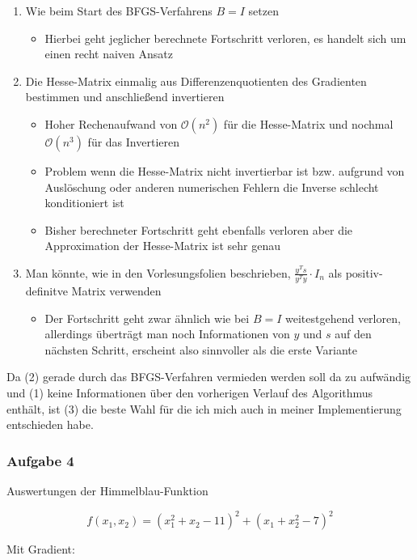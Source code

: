 \documentclass[a4paper, 12pt]{report}
\begin{document}
\begin{enumerate}
  \item Wie beim Start des BFGS-Verfahrens $B = I$ setzen
  \begin{itemize}
    \item Hierbei geht jeglicher berechnete Fortschritt verloren, es handelt sich um einen recht naiven Ansatz
  \end{itemize}
  \item Die Hesse-Matrix einmalig aus Differenzenquotienten des Gradienten bestimmen und anschließend invertieren
  \begin{itemize}
    \item Hoher Rechenaufwand von $\mathcal{O}(n^2)$ für die Hesse-Matrix und nochmal $\mathcal{O}(n^3)$ für das Invertieren
    \item Problem wenn die Hesse-Matrix nicht invertierbar ist bzw. aufgrund von Auslöschung oder anderen numerischen Fehlern
    die Inverse schlecht konditioniert ist
    \item Bisher berechneter Fortschritt geht ebenfalls verloren aber die Approximation der Hesse-Matrix ist sehr genau
  \end{itemize}
  \item Man könnte, wie in den Vorlesungsfolien beschrieben, $\frac{y^Ts}{y^Ty}\cdot I_n$ als positiv-definitve Matrix verwenden
  \begin{itemize}
    \item Der Fortschritt geht zwar ähnlich wie bei $B = I$ weitestgehend verloren, allerdings überträgt man noch Informationen
    von $y$ und $s$ auf den nächsten Schritt, erscheint also sinnvoller als die erste Variante
  \end{itemize}
\end{enumerate}

Da (2) gerade durch das BFGS-Verfahren vermieden werden soll da zu aufwändig und (1) keine Informationen über den vorherigen Verlauf
des Algorithmus enthält, ist (3) die beste Wahl für die ich mich auch in meiner Implementierung entschieden habe.

\subsubsection{Aufgabe 4}

Auswertungen der Himmelblau-Funktion

$$f(x_1, x_2) = (x_1^2 + x_2 - 11)^2 + (x_1 + x_2^2 - 7)^2$$

Mit Gradient:
\end{document}
